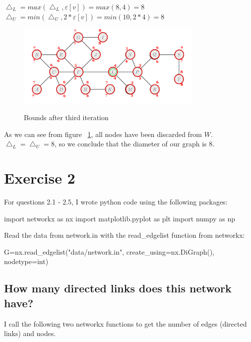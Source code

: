 \documentclass[12pt]{amsart}
\begin{document}
$\bigtriangleup_L = max(\bigtriangleup_L, \varepsilon[v]) = max(8, 4) = 8$ \\
$\bigtriangleup_U = min(\bigtriangleup_U, 2* \varepsilon[v]) = min(10, 2*4) = 8$ \\

\begin{figure}[h]
\caption{Bounds after third iteration}
\centering
\includegraphics[width=0.8\textwidth]{iter3.png}
\label{iter3}
\end{figure}

As we can see from figure ~\ref{iter3}, all nodes have been discarded from $W$. \\ $\bigtriangleup_L = \bigtriangleup_U = 8$, so we conclude that the diameter of our graph is 8.

\section{Exercise 2}

For questions 2.1 - 2.5, I wrote python code using the following packages:

\begin{python}
import networkx as nx
import matplotlib.pyplot as plt
import numpy as np
\end{python}

Read the data from network.in with the read\_edgelist function from networkx:

\begin{python}
G=nx.read_edgelist("data/network.in",
create_using=nx.DiGraph(), nodetype=int)
\end{python}


\subsection{How many directed links does this network have?}

I call the following two networkx functions to get the number of edges (directed links) and nodes.
\end{document}
